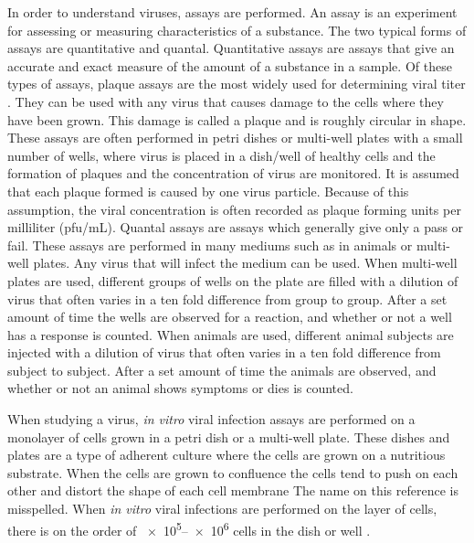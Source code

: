 In order to understand viruses, assays are performed. An assay is an experiment for assessing or measuring characteristics of a substance. The two typical forms of assays are quantitative and quantal. Quantitative assays are assays that give an accurate and exact measure of the amount of a substance in a sample. Of these types of assays, plaque assays are the most widely used for determining viral titer \citep{Kumar}. They can be used with any virus that causes damage to the cells where they have been grown. This damage is called a plaque and is roughly circular in shape. These assays are often performed in petri dishes or multi-well plates with a small number of wells, where virus is placed in a dish/well of healthy cells and the formation of plaques and the concentration of virus are monitored. It is assumed that each plaque formed is caused by one virus particle. Because of this assumption, the viral concentration is often recorded as plaque forming units per milliliter (pfu/mL). Quantal assays are assays which generally give only a pass or fail. These assays are performed in many mediums such as in animals or multi-well plates. Any virus that will infect the medium can be used. When multi-well plates are used, different groups of wells on the plate are filled with a dilution of virus that often varies in a ten fold difference from group to group. After a set amount of time the wells are observed for a reaction, and whether or not a well has a response is counted. When animals are used, different animal subjects are injected with a dilution of virus that often varies in a ten fold difference from subject to subject. After a set amount of time the animals are observed, and whether or not an animal shows symptoms or dies is counted.

When studying a virus, \emph{in vitro} viral infection assays are performed on a monolayer of cells grown in a petri dish or a multi-well plate. These dishes and plates are a type of adherent culture where the cells are grown on a nutritious substrate. When the cells are grown to confluence the cells tend to push on each other and distort the shape of each cell membrane \citep{bruckner_importance_2018} \color{red}The name on this reference is misspelled\color{black}. When \emph{in vitro} viral infections are performed on the layer of cells, there is on the order of \numrange[range-phrase = --]{e5}{e6} cells in the dish or well \citep{Number_of_cells_in_a_dish_noauthor_useful_nodate}. 

